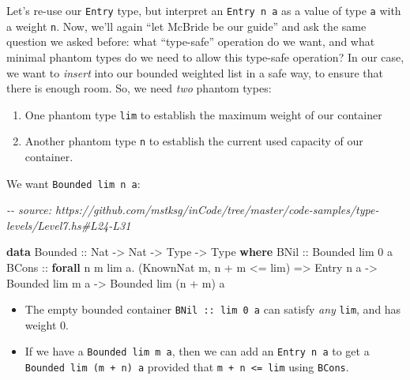 \documentclass[]{article}
\newenvironment{Shaded}{}{}
\newcommand{\CommentTok}[1]{\textcolor[rgb]{0.38,0.63,0.69}{\textit{#1}}}
\newcommand{\DataTypeTok}[1]{\textcolor[rgb]{0.56,0.13,0.00}{#1}}
\newcommand{\DecValTok}[1]{\textcolor[rgb]{0.25,0.63,0.44}{#1}}
\newcommand{\KeywordTok}[1]{\textcolor[rgb]{0.00,0.44,0.13}{\textbf{#1}}}
\newcommand{\NormalTok}[1]{#1}
\newcommand{\OperatorTok}[1]{\textcolor[rgb]{0.40,0.40,0.40}{#1}}
\newcommand{\OtherTok}[1]{\textcolor[rgb]{0.00,0.44,0.13}{#1}}
\begin{document}
Let's re-use our \texttt{Entry} type, but interpret an \texttt{Entry\ n\ a} as a
value of type \texttt{a} with a weight \texttt{n}. Now, we'll again ``let
McBride be our guide'' and ask the same question we asked before: what
``type-safe'' operation do we want, and what minimal phantom types do we need to
allow this type-safe operation? In our case, we want to \emph{insert} into our
bounded weighted list in a safe way, to ensure that there is enough room. So, we
need \emph{two} phantom types:

\begin{enumerate}
\def\labelenumi{\arabic{enumi}.}
\tightlist
\item
  One phantom type \texttt{lim} to establish the maximum weight of our container
\item
  Another phantom type \texttt{n} to establish the current used capacity of our
  container.
\end{enumerate}

We want \texttt{Bounded\ lim\ n\ a}:

\begin{Shaded}
\begin{Highlighting}[]
\CommentTok{{-}{-} source: https://github.com/mstksg/inCode/tree/master/code{-}samples/type{-}levels/Level7.hs\#L24{-}L31}

\KeywordTok{data} \DataTypeTok{Bounded}\OtherTok{ ::} \DataTypeTok{Nat} \OtherTok{{-}\textgreater{}} \DataTypeTok{Nat} \OtherTok{{-}\textgreater{}} \DataTypeTok{Type} \OtherTok{{-}\textgreater{}} \DataTypeTok{Type} \KeywordTok{where}
  \DataTypeTok{BNil}\OtherTok{ ::} \DataTypeTok{Bounded}\NormalTok{ lim }\DecValTok{0}\NormalTok{ a}
  \DataTypeTok{BCons} \OtherTok{::}
    \KeywordTok{forall}\NormalTok{ n m lim a}\OperatorTok{.}
\NormalTok{    (}\DataTypeTok{KnownNat}\NormalTok{ m, n }\OperatorTok{+}\NormalTok{ m }\OperatorTok{\textless{}=}\NormalTok{ lim) }\OtherTok{=\textgreater{}}
    \DataTypeTok{Entry}\NormalTok{ n a }\OtherTok{{-}\textgreater{}}
    \DataTypeTok{Bounded}\NormalTok{ lim m a }\OtherTok{{-}\textgreater{}}
    \DataTypeTok{Bounded}\NormalTok{ lim (n }\OperatorTok{+}\NormalTok{ m) a}
\end{Highlighting}
\end{Shaded}

\begin{itemize}
\tightlist
\item
  The empty bounded container \texttt{BNil\ ::\ lim\ 0\ a} can satisfy
  \emph{any} \texttt{lim}, and has weight 0.
\item
  If we have a \texttt{Bounded\ lim\ m\ a}, then we can add an
  \texttt{Entry\ n\ a} to get a \texttt{Bounded\ lim\ (m\ +\ n)\ a} provided
  that \texttt{m\ +\ n\ \textless{}=\ lim} using \texttt{BCons}.
\end{itemize}
\end{document}

